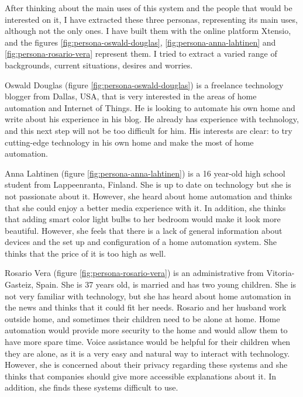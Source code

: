 After thinking about the main uses of this system and the people that would be interested on it, I have extracted these three personas, 
representing its main uses, although not the only ones. I have built them with the online platform Xtensio, and the figures
\ref{fig:persona-oswald-douglas}, \ref{fig:persona-anna-lahtinen} and \ref{fig:persona-rosario-vera} represent them. I tried to extract 
a varied range of backgrounds, current situations, desires and worries. 

Oswald Douglas (figure \ref{fig:persona-oswald-douglas}) is a freelance technology blogger from Dallas, USA, that is very interested 
in the areas of home automation and Internet of Things. He is looking to automate his own home and write about his experience in 
his blog. He already has experience with technology, and this next step will not be too difficult for him. His interests are clear: 
to try cutting-edge technology in his own home and make the most of home automation.

Anna Lahtinen (figure \ref{fig:persona-anna-lahtinen}) is a 16 year-old high school student from Lappeenranta, Finland. She is up 
to date on technology but she is not passionate about it. However, she heard about home automation and thinks that she could enjoy 
a better media experience with it. In addition, she thinks that adding smart color light bulbs to her bedroom would make it look more 
beautiful. However, she feels that there is a lack of general information about devices and the set up and configuration of a home 
automation system. She thinks that the price of it is too high as well.

Rosario Vera (figure \ref{fig:persona-rosario-vera}) is an administrative from Vitoria-Gasteiz, Spain. She is 37 years old, is married and 
has two young children. She is not very familiar with technology, but she has heard about home automation in the news and thinks 
that it could fit her needs. Rosario and her husband work outside home, and sometimes their children need to be alone at home. Home 
automation would provide more security to the home and would allow them to have more spare time. Voice assistance would be helpful 
for their children when they are alone, as it is a very easy and natural way to interact with technology. However, she is concerned about 
their privacy regarding these systems and she thinks that companies should give more accessible explanations about it. In addition, 
she finds these systems difficult to use.

